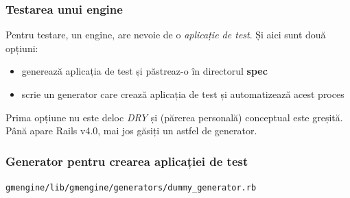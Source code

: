 \documentclass[compress]{beamer}
\begin{document}
\begin{frame}
\frametitle{Testarea unui engine}

Pentru testare, un engine, are nevoie de o \emph{aplicație de test}.
Și aici sunt două opțiuni:
\begin{itemize}[<+->]
  \item generează aplicația de test și păstreaz-o în directorul \textbf{spec}
  \item scrie un generator care crează aplicația de test și automatizează acest proces
\end{itemize}

Prima opțiune nu este deloc \emph{DRY} și (părerea personală) conceptual este greșită.
Până apare Rails v4.0, mai jos găsiți un astfel de generator.
\end{frame}

\begin{frame}
\frametitle{Generator pentru crearea aplicației de test}

\texttt{gmengine/lib/gmengine/generators/dummy\_generator.rb}
\inputminted[fontsize=\tiny,gobble=0,linenos=true,firstline=0,lastline=0]{ruby}{code/gmengine/lib/gmengine/generators/dummy_generator.rb}
\end{frame}
\end{document}
